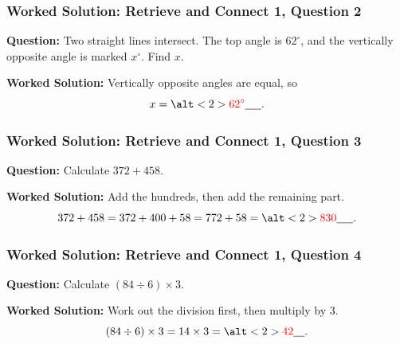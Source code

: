 \documentclass[aspectratio=169]{beamer}
\newcommand{\ablank}[1]{%
  \alt<2>{\textcolor{red}{#1}}{\underline{\phantom{#1}}}%
}
\begin{document}
\begin{frame}
  \frametitle{Worked Solution: Retrieve and Connect 1, Question 2}

  \textbf{Question:} Two straight lines intersect. The top angle is \(62^\circ\), and the vertically opposite angle is marked \(x^\circ\). Find \(x\).

  \begin{center}
  \end{center}

  \textbf{Worked Solution:} Vertically opposite angles are equal, so
  \[
  x = \ablank{62^\circ}.
  \]
\end{frame}

\begin{frame}
  \frametitle{Worked Solution: Retrieve and Connect 1, Question 3}

  \textbf{Question:} Calculate \(372 + 458\).

  \textbf{Worked Solution:} Add the hundreds, then add the remaining part.
  \[
  372 + 458 = 372 + 400 + 58 = 772 + 58 = \ablank{830}.
  \]
\end{frame}

\begin{frame}
  \frametitle{Worked Solution: Retrieve and Connect 1, Question 4}

  \textbf{Question:} Calculate \((84 \div 6) \times 3\).

  \textbf{Worked Solution:} Work out the division first, then multiply by \(3\).
  \[
  (84 \div 6) \times 3 = 14 \times 3 = \ablank{42}.
  \]
\end{frame}
\end{document}
